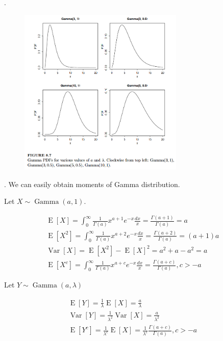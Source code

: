 \documentclass[8pt]{beamer}
\newcommand{\expec}[1]{\operatorname{E}\left[ #1 \right]}
\newcommand{\Var}[1]{\operatorname{Var}\left[#1\right]}
\newcommand{\GammaDist}[2]{\operatorname{Gamma}\!\left(#1, #2\right)}
\begin{document}
\begin{frame}{.}
    \begin{figure}
        \includegraphics[width=0.7\textwidth]{GammaDistShapes.png}
    \end{figure}
\end{frame}

\begin{frame}{.}
    We can easily obtain moments of Gamma distribution.

    Let $X \sim \GammaDist{a}{1}$.

    \[
    \begin{gathered}
        \expec{X} = \int_0^\infty \frac{1}{\Gamma(a)} x^{a+1} e^{-x} \frac{dx}{x} = \frac{\Gamma(a+1)}{\Gamma(a)} = a \\
        \expec{X^2} = \int_0^\infty \frac{1}{\Gamma(a)} x^{a+2} e^{-x} \frac{dx}{x} = \frac{\Gamma(a+2)}{\Gamma(a)} = (a+1)a \\
        \Var{X} = \expec{X^2} - {\expec{X}}^2 = a^2 + a - a^2 = a \\
        \expec{X^c} = \int_0^\infty \frac{1}{\Gamma(a)} x^{a+c}e^{-x} \frac{dx}{x} = \frac{\Gamma(a+c)}{\Gamma(a)}, c>-a
    \end{gathered}
    \]

    Let $Y \sim \GammaDist{a}{\lambda}$

    \[
        \begin{gathered}
            \expec{Y} = \frac{1}{\lambda} \expec{X} = \frac{a}{\lambda} \\
            \Var{Y} = \frac{1}{\lambda^2} \Var{X} = \frac{a}{\lambda^2} \\
            \expec{Y^c} = \frac{1}{\lambda^c} \expec{X} = \frac{1}{\lambda^c}\frac{\Gamma(a+c)}{\Gamma(a)}, c>-a
        \end{gathered}
    \]
\end{frame}
\end{document}
